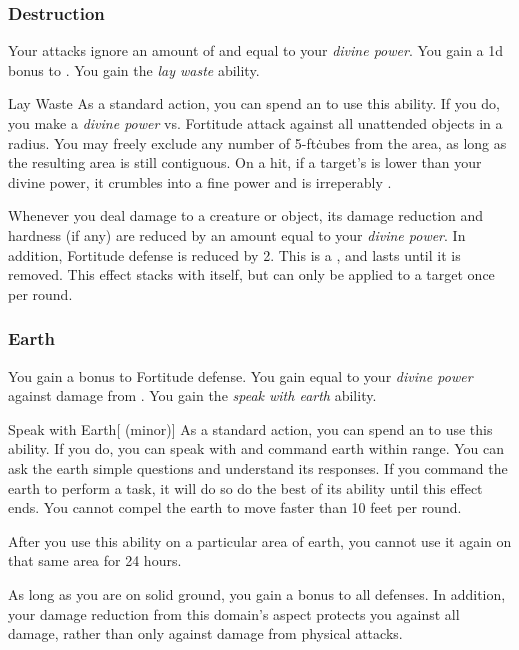         \subsubsection{Destruction}
             Your attacks ignore an amount of  and  equal to your \textit{divine power}.
             You gain a \plus1d bonus to .
             You gain the \textit{lay waste} ability.
            \begin{ability}{Lay Waste}
                As a standard action, you can spend an  to use this ability.
                If you do, you make a \textit{divine power} vs. Fortitude attack against all unattended objects in a \arealarge radius.
                You may freely exclude any number of 5-ft\. cubes from the area, as long as the resulting area is still contiguous.
                On a hit, if a target's  is lower than your divine power, it crumbles into a fine power and is irreperably .
            \end{ability}
             Whenever you deal damage to a creature or object, its damage reduction and hardness (if any) are reduced by an amount equal to your \textit{divine power}.
            In addition, Fortitude defense is reduced by 2.
            This is a , and lasts until it is removed.
            This effect stacks with itself, but can only be applied to a target once per round.

        \subsubsection{Earth}
             You gain a  bonus to Fortitude defense.
             You gain  equal to your \textit{divine power} against damage from .
             You gain the \textit{speak with earth} ability.
            \begin{ability}{Speak with Earth}[ (minor)]
                As a standard action, you can spend an  to use this ability.
                If you do, you can speak with and command earth within \rnglong range.
                You can ask the earth simple questions and understand its responses.
                If you command the earth to perform a task, it will do so do the best of its ability until this effect ends.
                You cannot compel the earth to move faster than 10 feet per round.

                After you use this ability on a particular area of earth, you cannot use it again on that same area for 24 hours.
            \end{ability}
             As long as you are on solid ground, you gain a  bonus to all defenses.
            In addition, your damage reduction from this domain's aspect protects you against all damage, rather than only against damage from physical attacks.

